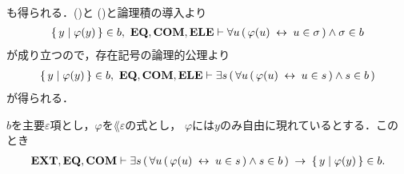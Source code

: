 \begin{sketch}
\begin{align}
		\end{align}
		も得られる．()と
		()と論理積の導入より
		\begin{align}
			\{\, y \mid \varphi(y)\, \} \in b,\ \mbox{{\bf EQ}},\mbox{\bf COM},\mbox{{\bf ELE}} \vdash
			\forall u\, (\, \varphi(u) \hspace{0.25em}\leftrightarrow\hspace{0.25em} u \in \sigma\, ) \wedge \sigma \in b
		\end{align}
		が成り立つので，存在記号の論理的公理より
		\begin{align}
			\{\, y \mid \varphi(y)\, \} \in b,\ \mbox{{\bf EQ}},\mbox{\bf COM},\mbox{{\bf ELE}} \vdash
			\exists s\, (\, \forall u\, (\, \varphi(u) \hspace{0.25em}\leftrightarrow\hspace{0.25em} u \in s\, ) \wedge s \in b\, )
		\end{align}
		が得られる．
		\QED
	\end{sketch}
	
	\begin{screen}
		\begin{thm}
		\label{thm:equivalent_formula_rewriting_10}
			$b$を主要$\varepsilon$項とし，$\varphi$を$\lang{\varepsilon}$の式とし，
			$\varphi$には$y$のみ自由に現れているとする．このとき
			\begin{align}
				\mbox{{\bf EXT}},\mbox{{\bf EQ}},\mbox{\bf COM} \vdash \exists s\, (\, \forall u\, (\, \varphi(u) \hspace{0.25em}\leftrightarrow\hspace{0.25em} u \in s\, ) \wedge s \in b\, ) \hspace{0.25em}\rightarrow\hspace{0.25em} \{\, y \mid \varphi(y)\, \} \in b.
			\end{align}
		\end{thm}
	\end{screen}
	
